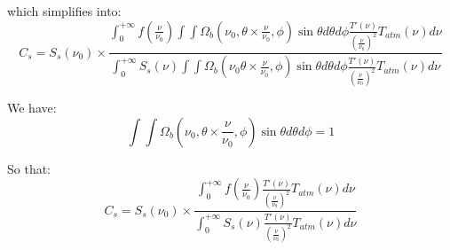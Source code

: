 which simplifies into:
\begin{equation}
C_{s} = S_{s}(\nu_{0})  \times \frac{
  \int_{0}^{+\infty} f(\frac{\nu}{\nu_{0}}) \int\int \Omega_{b}(\nu_{0}, \theta \times \frac{\nu}{\nu_{0}},
\phi)  \sin \theta d\theta d\phi \frac{T'(\nu)}{\left(\frac{\nu}{\nu_{0}}\right)^{2}} 
T_{atm}(\nu) d\nu}
{
\int_{0}^{+\infty} S_{s}(\nu) \int \int \Omega_{b}(\nu_{0} \theta \times \frac{\nu}{\nu_{0}},
\phi) \sin \theta  d\theta d\phi \frac{T'(\nu)}{\left(\frac{\nu}{\nu_{0}}\right)^{2}} 
T_{atm}(\nu) d\nu 
}
\end{equation}

We have:
\begin{equation}
\int\int \Omega_{b}(\nu_{0}, \theta \times \frac{\nu}{\nu_{0}},
\phi)  \sin \theta  d\theta d\phi = 1
\end{equation}

So that:
\begin{equation}
C_{s} = S_{s}(\nu_{0})  \times \frac{
  \int_{0}^{+\infty} f(\frac{\nu}{\nu_{0}}) \frac{T'(\nu)}{\left(\frac{\nu}{\nu_{0}}\right)^{2}} 
T_{atm}(\nu) d\nu}
{
\int_{0}^{+\infty} S_{s}(\nu)  \frac{T'(\nu)}{\left(\frac{\nu}{\nu_{0}}\right)^{2}} 
T_{atm}(\nu) d\nu 
}
\label{eq:color_corr_atm}
\end{equation}






 


